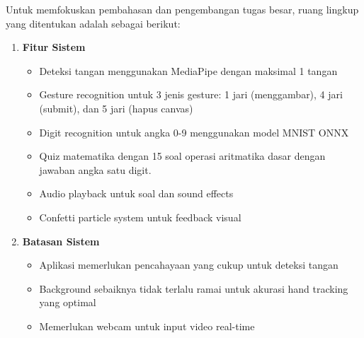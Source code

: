 Untuk memfokuskan pembahasan dan pengembangan tugas besar, ruang lingkup yang ditentukan adalah sebagai berikut:

\begin{enumerate}
    \item \textbf{Fitur Sistem}
    \begin{itemize}
        \item Deteksi tangan menggunakan MediaPipe dengan maksimal 1 tangan
        \item Gesture recognition untuk 3 jenis gesture: 1 jari (menggambar), 4 jari (submit), dan 5 jari (hapus canvas)
        \item Digit recognition untuk angka 0-9 menggunakan model MNIST ONNX
        \item Quiz matematika dengan 15 soal operasi aritmatika dasar dengan jawaban angka satu digit.
        \item Audio playback untuk soal dan sound effects
        \item Confetti particle system untuk feedback visual
    \end{itemize}
    
    \item \textbf{Batasan Sistem}
    \begin{itemize}
        \item Aplikasi memerlukan pencahayaan yang cukup untuk deteksi tangan
        \item Background sebaiknya tidak terlalu ramai untuk akurasi hand tracking yang optimal
        \item Memerlukan webcam untuk input video real-time
    \end{itemize}
\end{enumerate}

\newpage